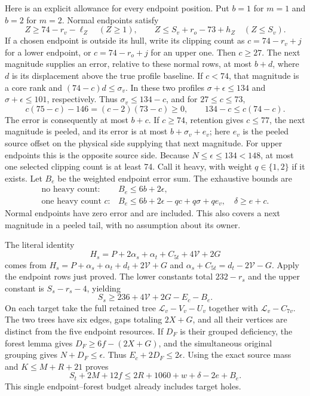 \documentclass[11pt,letterpaper]{article}
\theoremstyle{definition}\newtheorem{definition}[theorem]{Definition}
\begin{document}
Here is an explicit allowance for every endpoint position. Put $b=1$
for $m=1$ and $b=2$ for $m=2$. Normal endpoints satisfy
\[
Z\ge74-r_v-\ell_Z\quad(Z\ge1),\qquad
Z\le S_v+r_o-73+h_Z\quad(Z\le S_v).
\]
If a chosen endpoint is outside its hull, write its clipping count as
$c=74-r_v+j$ for a lower endpoint, or $c=74-r_o+j$ for an upper one.
Then $c\ge27$. The next magnitude supplies an error, relative to these
normal rows, at most $b+d$, where $d$ is its displacement above the true
profile baseline. If $c<74$, that magnitude is a core rank and
$(74-c)d\le\sigma_v$. In these two profiles
$\sigma+\epsilon\le134$ and $\sigma+\epsilon\le101$, respectively.
Thus $\sigma_v\le134-c$, and for $27\le c\le73$,
\[
c(75-c)-146=(c-2)(73-c)\ge0,
\qquad134-c\le c(74-c).
\]
The error is consequently at most $b+c$.
If $c\ge74$, retention gives $c\le77$, the next magnitude is peeled,
and its error is at most $b+\sigma_v+e_v$; here $e_v$ is the peeled
source offset on the physical side supplying that next magnitude.
For upper endpoints this is the opposite source side.
Because $N\le\epsilon\le134<148$, at most one selected clipping
count is at least 74. Call it heavy, with weight $q\in\{1,2\}$ if it
exists. Let $B_e$ be the weighted endpoint error sum. The exhaustive
bounds are
\begin{equation}\label{eq:p3-a0-errors}
\begin{array}{ll}
\text{no heavy count:}&B_e\le6b+2\epsilon,\\
\text{one heavy count }c:&B_e\le6b+2\epsilon-qc+q\sigma+qe_v,\quad
\delta\ge e+c.
\end{array}
\end{equation}
Normal endpoints have zero error and are included. This also covers a
next magnitude in a peeled tail, with no assumption about its owner.

The literal identity
\[
H_s=P+2\alpha_s+\alpha_t+C_{5t}+4\mathcal V+2G
\]
comes from $H_s=P+\alpha_s+\alpha_t+d_t+2\mathcal V+G$ and
$\alpha_s+C_{5t}=d_t-2\mathcal V-G$.
Apply the endpoint rows just proved. The lower constants total
$232-r_s$ and the upper constant is $S_s-r_s-4$, yielding
\[
S_s\ge236+4\mathcal V+2G-E_c-B_e.
\]
On each target take the full retained tree
$\mathcal L_v-V_v-U_v$ together with $\mathcal L_v-C_{7v}$.
The two trees have six edges, gaps totaling $2X+G$, and all their
vertices are distinct from the five endpoint resources.
If $D_F$ is their grouped deficiency, the forest lemma gives
$D_F\ge6f-(2X+G)$, and the simultaneous original grouping gives
$N+D_F\le\epsilon$. Thus $E_c+2D_F\le2\epsilon$.
Using the exact source mass and $K\le M+R+21$ proves
\begin{equation}\label{eq:p3-a0-main}
S_t+2M+12f\le2R+1060+w+\delta-2e+B_e.
\end{equation}
This single endpoint--forest budget already includes target holes.
\end{document}
